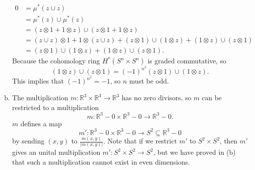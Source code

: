 \documentclass[letterpaper, 12pt]{article}
\begin{document}
\begin{solution}
\begin{enumerate}[(a)]
\begin{align*}
0&=\mu^*(z\cup z)\\
 &=\mu^*(z)\cup\mu^*(z)\\ 
 &=(z\otimes 1+1\otimes z)\cup (z\otimes 1+1\otimes z)\\ 
 &=(z\cup z)\otimes 1+1\otimes (z\cup z)+ (z\otimes 1)\cup (1\otimes z)+(1\otimes z)\cup (z\otimes 1)\\
 &=(z\otimes 1)\cup (1\otimes z)+(1\otimes z)\cup (z\otimes 1).
\end{align*}
Because the cohomology ring \(H^*(S^n\times S^n)\) is graded commutative, so 
\[(1\otimes z)\cup (z\otimes 1)=(-1)^{n^2}(z\otimes 1)\cup (1\otimes z).\]
This implies that \((-1)^{n^2}=-1\), so \(n\) must be odd. 
\item The multiplication \(m:\mathbb{R}^3\times \mathbb{R}^3\rightarrow \mathbb{R}^3\) has no zero divisors, so \(m\) can be restricted to a multiplication
\[m:\mathbb{R}^3-0\times \mathbb{R}^3-0\rightarrow \mathbb{R}^3-0.\]
\(m\) defines a map 
\[m':\mathbb{R}^3-0\times \mathbb{R}^3-0\rightarrow S^2\subseteq \mathbb{R}^3-0\]
by sending \((x,y)\) to \(\frac{m(x,y)}{|m(x,y)|}\). Note that if we restrict \(m'\) to \(S^2\times S^2\), then \(m'\) gives an unital multiplication \(m':S^2\times S^2\rightarrow S^2\), but we have proved in (b) that such a multiplication cannot exist in even dimensions. 
\end{enumerate}
\end{solution}
\end{document}
